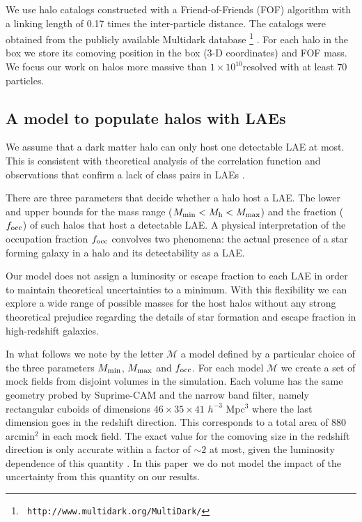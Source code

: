 \documentclass{emulateapj}
\newcommand{\documentname}{paper~}
\newcommand{\ly}{{\ifmmode{{\rm Ly}\alpha}\else{Ly$\alpha$~}\fi}}
\newcommand{\hMsun}{{\ifmmode{h^{-1}{\rm
        {M_{\odot}}}}\else{$h^{-1}{\rm{M_{\odot}}}$}\fi}}
\begin{document}
We use halo catalogs constructed with a Friend-of-Friends (FOF)
algorithm with a linking length of 0.17 times the inter-particle
distance. The catalogs were obtained from the publicly available
Multidark database \footnote{{\tt
    http://www.multidark.org/MultiDark/}} \citep{MultiDark}. For each
halo in the box we store its comoving position in the box (3-D
coordinates) and FOF mass. We focus our work on halos more massive
than $1\times 10^{10}$\hMsun resolved with at least $70$ particles.

\subsection{A model to populate halos with LAEs}
\label{subsec:mocks}

We assume that a dark matter halo can only host one detectable LAE at
most.  This is consistent with theoretical analysis of the correlation
function \citep{Jose2013b} and observations that confirm a lack of
class pairs in LAEs \cite{Bond2009}. 

There are three parameters that decide whether a halo host a LAE. The
lower and upper bounds for the mass range ($M_{\rm min}< M_{\rm h} < M_{\rm max}$) 
and the fraction ($f_{\rm occ}$) of such halos that host a detectable
LAE. A physical interpretation of the occupation fraction $f_{\rm
  occ}$ convolves two phenomena: the actual presence of a star forming
galaxy in a halo and its detectability as a LAE.  


Our model does not assign a luminosity or escape fraction to each
LAE in order to maintain theoretical uncertainties to a minimum. With
this flexibility we can explore a wide range of possible masses for
the host halos without any strong theoretical prejudice regarding the
details of star formation and \ly escape fraction in high-redshift
galaxies.  

In what follows we note by the letter ${\mathcal M}$ a model
defined by a particular choice of the three parameters $M_{\rm
  min}$, $M_{\rm  max}$ and $f_{\rm occ}$. For each model ${\mathcal
  M}$ we create a set of mock fields from disjoint volumes in the
simulation. Each volume has the same geometry probed by Suprime-CAM
and the narrow band filter, namely rectangular cuboids of dimensions
$46\times 35\times 41$ $h^{-3}$ Mpc$^{3}$ where the last dimension goes
in the redshift direction. This corresponds to a total area of $880$
arcmin$^{2}$ in each mock field. The exact value for the comoving size
in the redshift direction is only accurate within a factor of $\sim 2$
at most, given the luminosity dependence of this quantity
\citep{Gronwall07}. In this \documentname we do not model the impact
of the uncertainty from this quantity on our results.
\end{document}

